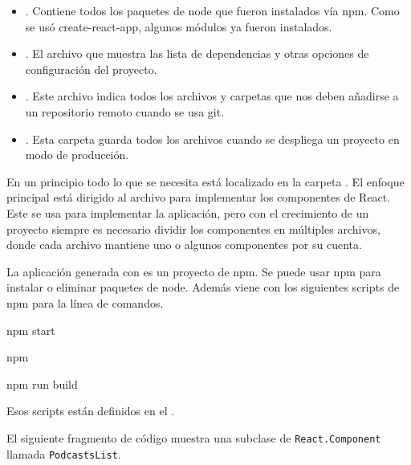 \begin{itemize}
\item {} 
. Contiene todos los paquetes de node que fueron instalados vía npm. Como se usó create-react-app, algunos módulos ya fueron instalados.

\item {} 
. El archivo que muestra las lista de dependencias y otras opciones de configuración del proyecto.

\item {} 
. Este archivo indica todos los archivos y carpetas que nos deben añadirse a un repositorio remoto cuando se usa git.

\item {} 
. Esta carpeta guarda todos los archivos cuando se despliega un proyecto en modo de producción.

\end{itemize}

En un principio todo lo que se necesita está localizado en la carpeta .
El enfoque principal está dirigido al archivo  para implementar los
componentes de React. Este se usa para implementar la aplicación, pero con el
crecimiento de un proyecto siempre es necesario dividir los componentes en
múltiples archivos, donde cada archivo mantiene uno o algunos componentes por
su cuenta.

La aplicación generada con  es un proyecto de npm. Se puede usar
npm para instalar o eliminar paquetes de node. Además viene con los siguientes
scripts de npm para la línea de comandos.

%
\begin{sphinxVerbatim}[commandchars=\\\{\}]
npm start

npm 

npm run build
\end{sphinxVerbatim}

Esos scripts están definidos en el .

El siguiente fragmento de código muestra una subclase
de \texttt{React.Component} llamada \texttt{PodcastsList}.


